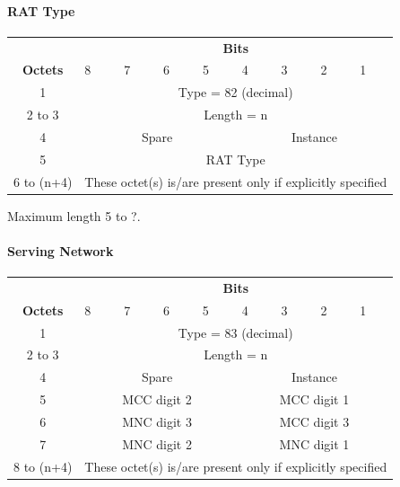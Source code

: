 \paragraph{RAT Type}
\centering
\begin{tabular}{c|p{1cm}|p{1cm}|p{1cm}|p{1cm}|p{1cm}|p{1cm}|p{1cm}|p{1cm}|}
\multicolumn{1}{c}{} & \multicolumn{8}{c}{\textbf{Bits}} \\
\cline{2-9} \textbf{Octets} & 8 & 7 & 6 & 5 & 4 & 3 & 2 & 1 \\ 
\cline{2-9} 1 & \multicolumn{8}{c|}{Type = 82 (decimal)} \\ 
\cline{2-9} 2 to 3 & \multicolumn{8}{c|}{Length = n}  \\ 
\cline{2-9} 4 & \multicolumn{4}{c|}{Spare} & \multicolumn{4}{c|}{Instance} \\ 
\cline{2-9} 5 & \multicolumn{8}{c|}{RAT Type} \\
\cline{2-9} 6 to (n+4) & \multicolumn{8}{c|}{These octet(s) is/are present only if explicitly specified} \\
\cline{2-9}
\end{tabular} 

Maximum length 5 to ?.

\paragraph{Serving Network}

\centering
\begin{tabular}{c|p{1cm}|p{1cm}|p{1cm}|p{1cm}|p{1cm}|p{1cm}|p{1cm}|p{1cm}|}
\multicolumn{1}{c}{} & \multicolumn{8}{c}{\textbf{Bits}} \\
\cline{2-9} \textbf{Octets} & 8 & 7 & 6 & 5 & 4 & 3 & 2 & 1 \\ 
\cline{2-9} 1 & \multicolumn{8}{c|}{Type = 83 (decimal)} \\ 
\cline{2-9} 2 to 3 & \multicolumn{8}{c|}{Length = n}  \\ 
\cline{2-9} 4 & \multicolumn{4}{c|}{Spare} & \multicolumn{4}{c|}{Instance} \\ 
\cline{2-9} 5 & \multicolumn{4}{c|}{MCC digit 2} & \multicolumn{4}{c|}{MCC digit 1} \\ 
\cline{2-9} 6 & \multicolumn{4}{c|}{MNC digit 3} & \multicolumn{4}{c|}{MCC digit 3} \\ 
\cline{2-9} 7 & \multicolumn{4}{c|}{MNC digit 2} & \multicolumn{4}{c|}{MNC digit 1} \\ 
\cline{2-9} 8 to (n+4) & \multicolumn{8}{c|}{These octet(s) is/are present only if explicitly specified} \\
\cline{2-9}
\end{tabular} 

